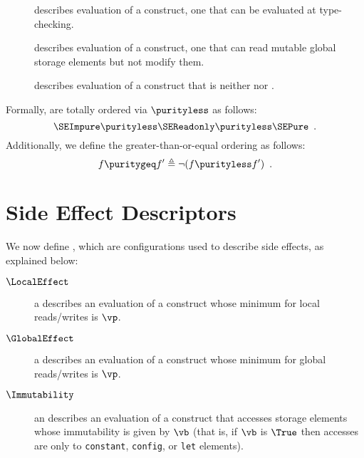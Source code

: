\BackupOriginalType{
\[
\TPurity \triangleq \{ \SEPure,\; \SEReadonly,\; \SEImpure \}
\]
}
\begin{description}
    \item[] describes evaluation of a \pureterm{} construct, one that can be evaluated at type-checking.

\item[] describes evaluation of a \readonlyterm{} construct, one that can read mutable global storage elements but not modify them.

\item[] describes evaluation of a construct that is neither \pureterm{} nor \readonlyterm{}.
\end{description}

Formally, \purities{} are totally ordered via $\purityless$ as follows:
\hypertarget{def-purityless}{}
\[
\SEImpure \purityless \SEReadonly \purityless \SEPure \enspace.
\]
Additionally, we define the greater-than-or-equal ordering as follows:
\hypertarget{def-puritygeq}{}
\[
f \puritygeq f' \triangleq \lnot(f \purityless f') \enspace.
\]

\section{Side Effect Descriptors\label{sec:SideEffectDescriptors}}

\hypertarget{def-sideeffectdescriptorterm}{}
We now define \sideeffectdescriptorsterm,
which are configurations used to describe side effects, as explained below:

\hypertarget{def-term-LocalEffect}{}
\begin{description}
    \item[$\LocalEffect$] a \LocalEffectTerm{} describes an evaluation of a construct whose minimum \purity{} for local reads/writes is $\vp$.
    \hypertarget{def-term-GlobalEffect}{}
    \item[$\GlobalEffect$] a \GlobalEffectTerm{} describes an evaluation of a construct whose minimum \purity{} for global reads/writes is $\vp$.
    \hypertarget{def-term-Immutability}{}
    \item[$\Immutability$] an \ImmutabilityTerm{} describes an evaluation of a construct that accesses storage elements whose immutability is given by $\vb$ (that is, if $\vb$ is $\True$ then accesses are only to \texttt{constant}, \texttt{config}, or \texttt{let} elements).
\end{description}

